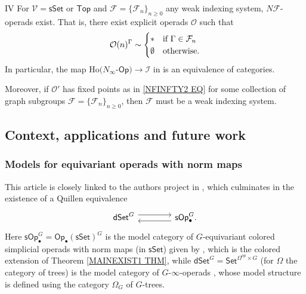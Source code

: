 \documentclass[a4paper,10pt
,draft
]{article}%
\numberwithin{equation}{section}
\numberwithin{figure}{section}
\theoremstyle{definition} %
\newcommand{\sSet}{\ensuremath{\mathsf{sSet}}}%
\newcommand{\Op}{\mathsf{Op}}%
\newcommand{\V}{\ensuremath{\mathcal V}}
\renewcommand{\O}{\ensuremath{\mathcal O}}
\newcommand{\1}{\ensuremath{\mathbbm 1}}%
\begin{document}
\begin{customcor}{IV}\label{NINFTY_REAL_COR_MAIN}
For $\V = \sSet$ or $\mathsf{Top}$ and 
$\mathcal{F} = \{\mathcal{F}_n\}_{n \geq 0}$
any weak indexing system,
$N \mathcal{F}$-operads exist. That is, there exist explicit operads $\O$
such that
\begin{equation}\label{NFINFTY2 EQ}
	\O(n)^{\Gamma} \sim 
\begin{cases}
	\** & \text{if } \Gamma \in \mathcal{F}_n
\\
	\emptyset & \text{otherwise}.
\end{cases}
\end{equation}  
In particular, the map $\mathrm{Ho}(N_\infty$-$\Op) \to \mathcal I$
in \cite[Cor. 5.6]{BH15}
 is an equivalence of categories.
 
 Moreover, if $\mathcal{O}'$ has fixed points as in 
 \eqref{NFINFTY2 EQ} for some collection of graph subgroups 
 $\mathcal{F} = \{\mathcal{F}_n\}_{n \geq 0}$, then 
 $\mathcal{F}$ must be a weak indexing system.
\end{customcor}




\subsection{Context, applications and future work}
\label{CONTEX SEC}


\subsubsection*{Models for equivariant operads with norm maps}


This article is closely linked to the authors project in
\cite{Pe17,BP_edss,BP_HGOP,BP_TAS},
which culminates in the existence of a Quillen equivalence
\cite[Thm. I]{BP_TAS}
\begin{equation}\label{DSETSOP_EQ}
\begin{tikzcd}[column sep =4em]
	\mathsf{dSet}^G \ar[shift left=1.5]{r} 
	&
	\mathsf{sOp}_{\bullet}^G.
\ar[shift left=1.5]{l}
\end{tikzcd}
\end{equation} 
Here $\mathsf{sOp}_{\bullet}^G = \Op_\bullet(\sSet)^G$
is the model category of $G$-equivariant colored simplicial operads
with norm maps (in $\mathsf{sSet}$)
given by \cite[Thm. III]{BP_HGOP},
which is the colored extension of Theorem \ref{MAINEXIST1 THM},
while 
$\mathsf{dSet}^G = \mathsf{Set}^{\Omega^{op} \times G}$
(for $\Omega$ the category of trees)
is the model category of
$G$-$\infty$-operads \cite[Thm. 2.1]{Pe17},
whose model structure is defined using the 
category $\Omega_G$ of $G$-trees.
\end{document}
